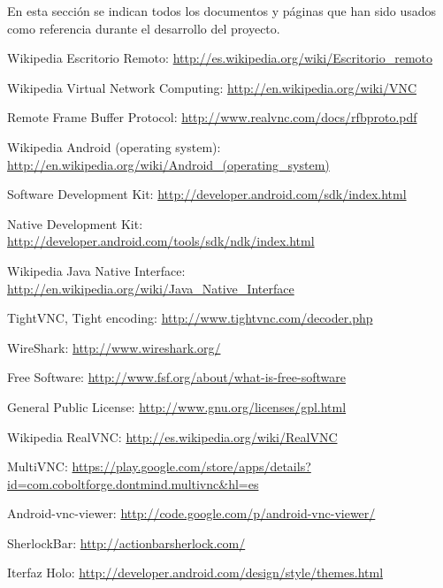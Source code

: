 En esta sección se indican todos los documentos y páginas que han sido usados como referencia durante el desarrollo del proyecto.

\begin{thebibliography}{11}

Wikipedia Escritorio Remoto: \url{http://es.wikipedia.org/wiki/Escritorio_remoto}

Wikipedia Virtual Network Computing: \url{http://en.wikipedia.org/wiki/VNC}

Remote Frame Buffer Protocol: \url{http://www.realvnc.com/docs/rfbproto.pdf}

Wikipedia Android (operating system): \url{http://en.wikipedia.org/wiki/Android_(operating_system)}

Software Development Kit:  \url{http://developer.android.com/sdk/index.html}

Native Development Kit: \url{http://developer.android.com/tools/sdk/ndk/index.html}

Wikipedia Java Native Interface: \url{http://en.wikipedia.org/wiki/Java_Native_Interface}

TightVNC, Tight encoding: \url{http://www.tightvnc.com/decoder.php}

WireShark: \url{http://www.wireshark.org/}

Free Software: \url{http://www.fsf.org/about/what-is-free-software}

General Public License: \url{http://www.gnu.org/licenses/gpl.html}

Wikipedia RealVNC: \url{http://es.wikipedia.org/wiki/RealVNC}

MultiVNC: \url{https://play.google.com/store/apps/details?id=com.coboltforge.dontmind.multivnc&hl=es}

Android-vnc-viewer: \url{http://code.google.com/p/android-vnc-viewer/}

SherlockBar: \url{http://actionbarsherlock.com/}

Iterfaz Holo: \url{http://developer.android.com/design/style/themes.html}

\end{thebibliography}
